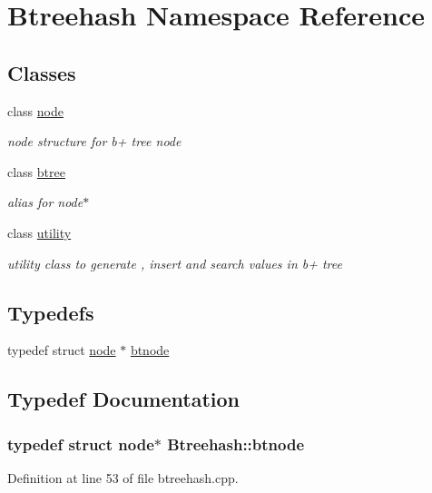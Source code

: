 \hypertarget{namespace_btreehash}{\section{Btreehash Namespace Reference}
\label{namespace_btreehash}
}
\subsection*{Classes}
\begin{DoxyCompactItemize}
\item 
class \hyperlink{class_btreehash_1_1node}{node}
\begin{DoxyCompactList}\small\item\em node structure for b+ tree node \end{DoxyCompactList}\item 
class \hyperlink{class_btreehash_1_1btree}{btree}
\begin{DoxyCompactList}\small\item\em alias for node$\ast$ \end{DoxyCompactList}\item 
class \hyperlink{class_btreehash_1_1utility}{utility}
\begin{DoxyCompactList}\small\item\em utility class to generate , insert and search values in b+ tree \end{DoxyCompactList}\end{DoxyCompactItemize}
\subsection*{Typedefs}
\begin{DoxyCompactItemize}
\item 
typedef struct \hyperlink{class_btreehash_1_1node}{node} $\ast$ \hyperlink{namespace_btreehash_ac7db8bb3c794c446de540bf6a03955bc}{btnode}
\end{DoxyCompactItemize}


\subsection{Typedef Documentation}
\hypertarget{namespace_btreehash_ac7db8bb3c794c446de540bf6a03955bc}{
\subsubsection[{btnode}]{\setlength{\rightskip}{0pt plus 5cm}typedef struct {\bf node}$\ast$ {\bf Btreehash\-::btnode}}}\label{namespace_btreehash_ac7db8bb3c794c446de540bf6a03955bc}


Definition at line 53 of file btreehash.\-cpp.

